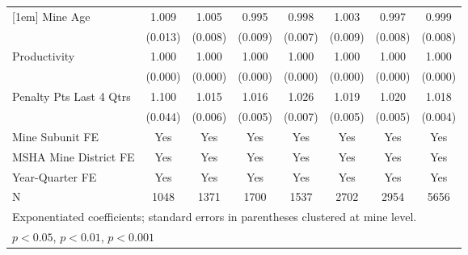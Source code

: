 {\begin{tabular}{l*{7}{c}}
[1em]
Mine Age                 &       1.009         &       1.005         &       0.995         &       0.998         &       1.003         &       0.997         &       0.999         \\
                         &     (0.013)         &     (0.008)         &     (0.009)         &     (0.007)         &     (0.009)         &     (0.008)         &     (0.008)         \\
[1em]
Productivity             &       1.000         &       1.000         &       1.000         &       1.000         &       1.000         &       1.000         &       1.000         \\
                         &     (0.000)         &     (0.000)         &     (0.000)         &     (0.000)         &     (0.000)         &     (0.000)         &     (0.000)         \\
[1em]
Penalty Pts Last 4 Qtrs  &       1.100\sym{*}  &       1.015\sym{*}  &       1.016\sym{***}&       1.026\sym{***}&       1.019\sym{***}&       1.020\sym{***}&       1.018\sym{***}\\
                         &     (0.044)         &     (0.006)         &     (0.005)         &     (0.007)         &     (0.005)         &     (0.005)         &     (0.004)         \\
[1em]
Mine Subunit FE          &         Yes         &         Yes         &         Yes         &         Yes         &         Yes         &         Yes         &         Yes         \\
[1em]
MSHA Mine District FE    &         Yes         &         Yes         &         Yes         &         Yes         &         Yes         &         Yes         &         Yes         \\
[1em]
Year-Quarter FE          &         Yes         &         Yes         &         Yes         &         Yes         &         Yes         &         Yes         &         Yes         \\
\hline
N                        &        1048         &        1371         &        1700         &        1537         &        2702         &        2954         &        5656         \\
\hline\hline
\multicolumn{8}{l}{\footnotesize Exponentiated coefficients; standard errors in parentheses clustered at mine level.}\\
\multicolumn{8}{l}{\footnotesize \sym{*} \(p<0.05\), \sym{**} \(p<0.01\), \sym{***} \(p<0.001\)}\\
\end{tabular}
}
